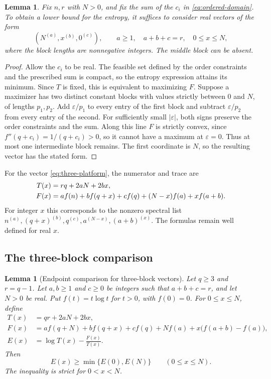 \documentclass[11pt,a4paper,reqno]{amsart}
\newtheorem{lemma}[theorem]{Lemma}
\theoremstyle{remark}
\numberwithin{equation}{section}
\begin{document}
\begin{lemma}\label{lem:polytope}
Fix $n,r$ with $N>0$, and fix the sum of the $c_i$ in
\eqref{eq:ordered-domain}. To obtain a lower bound for the entropy,
it suffices to consider real vectors of the form
\begin{equation}\label{eq:three-platform}
 (N^{(a)},x^{(b)},0^{(c)}),\qquad
 a\ge1,\quad a+b+c=r,\quad 0\le x\le N,
\end{equation}
where the block lengths are nonnegative integers. The middle block
can be absent.
\end{lemma}
\begin{proof}
Allow the $c_i$ to be real. The feasible set defined by the order
constraints and the prescribed sum is compact, so the entropy expression
attains its minimum. Since $T$ is fixed, this is equivalent to maximizing $F$.
Suppose a maximizer has two distinct constant blocks with values strictly
between $0$ and $N$, of lengths $p_1,p_2$. Add $\varepsilon/p_1$ to every
entry of the first block and subtract $\varepsilon/p_2$ from every entry
of the second. For sufficiently small $|\varepsilon|$, both signs preserve
the order constraints and the sum. Along this line $F$ is strictly convex,
since $f''(q+c_i)=1/(q+c_i)>0$, so it cannot have a maximum at
$\varepsilon=0$. Thus at most one intermediate block remains.
The first coordinate is $N$, so the resulting vector has the stated form.
\end{proof}

For the vector \eqref{eq:three-platform}, the numerator and trace are
\begin{align}\label{eq:three-platform-TF}
 T(x)&=rq+2aN+2bx,\notag\\
 F(x)&=a f(n)+b f(q+x)+c f(q)
            +(N-x)f(a)+xf(a+b).
\end{align}
For integer $x$ this corresponds to the nonzero spectral list
$n^{(a)},\allowbreak(q+x)^{(b)},\allowbreak q^{(c)},\allowbreak a^{(N-x)},\allowbreak(a+b)^{(x)}$.
The formulas remain well defined for real $x$.

\subsection{The three-block comparison}\label{subsec:three-level-comparison}


\begin{lemma}[Endpoint comparison for three-block vectors]\label{lem:three-level-endpoints}
Let $q\ge3$ and $r=q-1$. Let $a,b\ge1$ and $c\ge0$ be integers
such that $a+b+c=r$, and let $N>0$ be real. Put $f(t)=t\log t$ for $t>0$,
with $f(0)=0$. For $0\le x\le N$, define
\begin{align*}
 T(x)&=qr+2aN+2bx,\\
 F(x)&=a f(q+N)+b f(q+x)+c f(q)
       +N f(a)+x\bigl(f(a+b)-f(a)\bigr),\\
 E(x)&=\log T(x)-\frac{F(x)}{T(x)}.
\end{align*}
Then
\begin{equation}\label{eq:three-level-endpoints}
 E(x)\ge \min\{E(0),E(N)\}\qquad(0\le x\le N).
\end{equation}
The inequality is strict for $0<x<N$.
\end{lemma}
\end{document}
